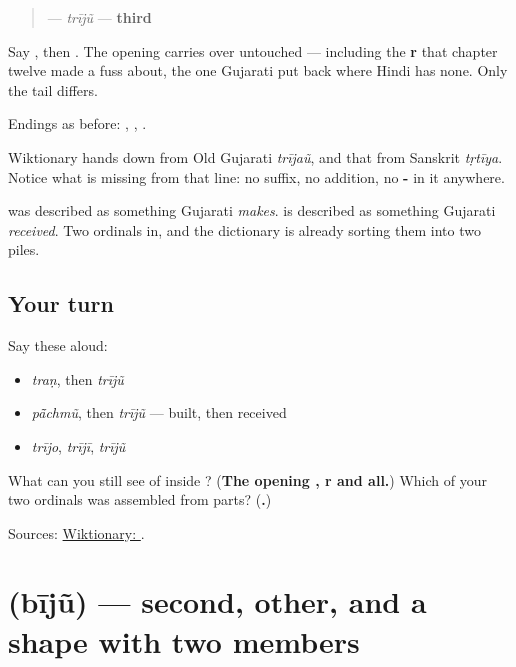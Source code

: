 \begin{quote}
\textbf{} — \emph{trījũ} — \textbf{third}
\end{quote}

Say \textbf{}, then \textbf{}. The opening \textbf{} carries over untouched — including the \textbf{r} that chapter twelve made a fuss about, the one Gujarati put back where Hindi has none. Only the tail differs.

Endings as before: \textbf{}, \textbf{}, \textbf{}.

\begin{cousinweb}
Wiktionary hands \textbf{} down from Old Gujarati \emph{trījaũ}, and that from Sanskrit \emph{tṛtīya}. Notice what is missing from that line: no suffix, no addition, no \textbf{-} in it anywhere.

\textbf{} was described as something Gujarati \emph{makes}. \textbf{} is described as something Gujarati \emph{received}. Two ordinals in, and the dictionary is already sorting them into two piles.
\end{cousinweb}

\subsection*{Your turn}
Say these aloud:

\begin{itemize}
\raggedright
  \item \emph{traṇ}, then \emph{trījũ}
  \item \emph{pā̃chmũ}, then \emph{trījũ} — built, then received
  \item \emph{trījo}, \emph{trījī}, \emph{trījũ}
\end{itemize}

\begin{tcolorbox}[breakable,colback=teal!4,colframe=teal!35!black,title={Before you move on}]
What can you still see of \textbf{} inside \textbf{}? (\textbf{The opening , r and all.}) Which of your two ordinals was assembled from parts? (\textbf{.})

Sources: \href{https://en.wiktionary.org/wiki/\%E0\%AA\%A4\%E0\%AB\%8D\%E0\%AA\%B0\%E0\%AB\%80\%E0\%AA\%9C\%E0\%AB\%81\%E0\%AA\%82}{Wiktionary: }.
\end{tcolorbox}
\section[\texorpdfstring{\gu{બીજું} (bījũ)}{બીજું (bījũ)}]{ (bījũ) — second, other, and a shape with two members}

